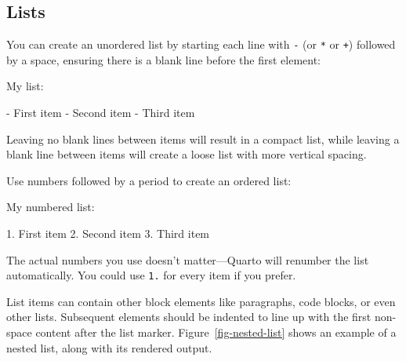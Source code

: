 \documentclass[
  letterpaper,
  DIV=11,
  numbers=noendperiod,
  oneside]{scrreprt}
\newenvironment{Shaded}{\begin{snugshade}}{\end{snugshade}}
\newcommand{\AnnotationTok}[1]{\textcolor[rgb]{0.37,0.37,0.37}{#1}}
\newcommand{\NormalTok}[1]{\textcolor[rgb]{0.00,0.23,0.31}{#1}}
\newcommand{\SpecialStringTok}[1]{\textcolor[rgb]{0.13,0.47,0.30}{#1}}
\begin{document}
\begin{tcolorbox}
\section{Lists}\label{lists-1}

You can create an unordered list by starting each line with \texttt{-}
(or \texttt{*} or \texttt{+}) followed by a space, ensuring there is a
blank line before the first element:

\begin{Shaded}
\begin{Highlighting}[]
\AnnotationTok{My list:}

\SpecialStringTok{{-} }\NormalTok{First item}
\SpecialStringTok{{-} }\NormalTok{Second item}
\SpecialStringTok{{-} }\NormalTok{Third item}
\end{Highlighting}
\end{Shaded}

Leaving no blank lines between items will result in a compact list,
while leaving a blank line between items will create a loose list with
more vertical spacing.

Use numbers followed by a period to create an ordered list:

\begin{Shaded}
\begin{Highlighting}[]
\AnnotationTok{My numbered list:}

\SpecialStringTok{1. }\NormalTok{First item}
\SpecialStringTok{2. }\NormalTok{Second item}
\SpecialStringTok{3. }\NormalTok{Third item}
\end{Highlighting}
\end{Shaded}

The actual numbers you use doesn't matter---Quarto will renumber the
list automatically. You could use \texttt{1.} for every item if you
prefer.

List items can contain other block elements like paragraphs, code
blocks, or even other lists. Subsequent elements should be indented to
line up with the first non-space content after the list marker.
Figure~\ref{fig-nested-list} shows an example of a nested list, along
with its rendered output.

\begin{figure}[H]

\centering{

\begin{Shaded}
\begin{Highlighting}[]
\SpecialStringTok{{-} }\NormalTok{First item with multiple paragraphs.}


\end{Highlighting}
\end{Shaded}}
\end{figure}
\end{tcolorbox}
\end{document}
